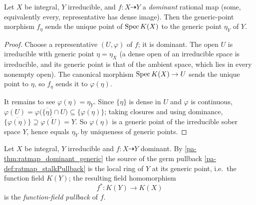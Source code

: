 \begin{theorem}
  \label{pa-thm:ratmap_dominant_generic}
  \leanok

  Let \(X\) be integral, \(Y\) irreducible, and \(f : X \dashrightarrow Y\) a
  \emph{dominant} rational map (some, equivalently every, representative has
  dense image). Then the generic-point morphism \(f_\eta\) sends the unique
  point of \(\operatorname{Spec} K(X)\) to the generic point \(\eta_Y\) of \(Y\).
\end{theorem}
\begin{proof}
  \leanok
  Choose a representative \((U, \varphi)\) of \(f\); it is dominant. The open
  \(U\) is irreducible with generic point \(\eta = \eta_X\) (a dense open of an
  irreducible space is irreducible, and its generic point is that of the ambient
  space, which lies in every nonempty open). The canonical morphism
  \(\operatorname{Spec} K(X) \to U\) sends the unique point to \(\eta\), so
  \(f_\eta\) sends it to \(\varphi(\eta)\).

  It remains to see \(\varphi(\eta) = \eta_Y\). Since \(\{\eta\}\) is dense in
  \(U\) and \(\varphi\) is continuous,
  \(\varphi(U) = \varphi\bigl(\overline{\{\eta\}} \cap U\bigr) \subseteq
  \overline{\{\varphi(\eta)\}}\); taking closures and using dominance,
  \(\overline{\{\varphi(\eta)\}} \supseteq \overline{\varphi(U)} = Y\). So
  \(\varphi(\eta)\) is a generic point of the irreducible sober space \(Y\),
  hence equals \(\eta_Y\) by uniqueness of generic points.
\end{proof}

\begin{definition}
  \label{pa-def:ratmap_functionFieldPullback}
  \leanok

  Let \(X\) be integral, \(Y\) irreducible and \(f : X \dashrightarrow Y\)
  dominant. By \ref{pa-thm:ratmap_dominant_generic} the source of the germ pullback
  \ref{pa-def:ratmap_stalkPullback} is the local ring of \(Y\) at its generic
  point, i.e.\ the function field \(K(Y)\); the resulting field homomorphism
  \[
    f^* : K(Y) \longrightarrow K(X)
  \]
  is the \emph{function-field pullback} of \(f\).
\end{definition}

